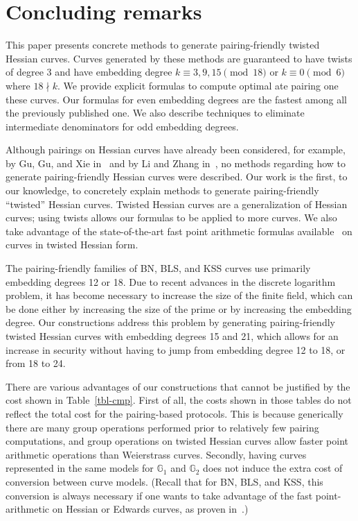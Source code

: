\section{Concluding remarks}
\label{sec:conclude}

This paper presents concrete methods to generate pairing-friendly twisted Hessian curves.
Curves generated by these methods are guaranteed to have twists of degree $3$
and have embedding degree
$k \equiv 3,9,15 \pmod{18}$ or
$k \equiv 0 \pmod{6}$ where $18 \nmid k$.
We provide explicit formulas to compute optimal ate pairing one these curves.
Our formulas for even embedding degrees are the fastest among all the previously published one.
We also describe techniques to eliminate intermediate denominators for odd embedding degrees.

Although pairings on Hessian curves have already been considered,
for example, by Gu, Gu, and Xie in~\cite{2010/Gu} and by Li and Zhang in~\cite{2012/Li},
no methods regarding how to generate pairing-friendly Hessian curves were described.
Our work is the first, to our knowledge, to concretely explain methods to generate
pairing-friendly ``twisted'' Hessian curves. %
Twisted Hessian curves are a generalization of Hessian curves; using twists allows our formulas to be applied to more curves.
We also take advantage of the state-of-the-art fast point arithmetic formulas available~\cite{2015/hessian}
on curves in twisted Hessian form.

The pairing-friendly families of BN, BLS, and KSS curves use primarily embedding degrees 12 or 18.
Due to recent advances in the discrete logarithm problem, it has become necessary to increase the size of the finite field,
which can be done either by increasing the size of the prime or by increasing the embedding degree.
Our constructions address this problem by generating pairing-friendly twisted Hessian curves with embedding degrees 15 and 21,
which allows for an increase in security without having to jump from embedding degree 12 to 18, or from 18 to 24.

There are various advantages of our constructions that cannot be justified by the cost shown in Table~\ref{tbl-cmp}. %
First of all, the costs shown in those tables do not reflect the total cost for the pairing-based protocols.
This is because generically there are many group operations performed prior to relatively few pairing computations,
and group operations on twisted Hessian curves allow faster point arithmetic operations than Weierstrass curves.
Secondly, having curves represented in the same models for $\mathbb{G}_1$ and $\mathbb{G}_2$ does not induce the extra cost of conversion between curve models.
(Recall that for BN, BLS, and KSS, this conversion is always necessary if one wants to take advantage of
the fast point-arithmetic on Hessian or Edwards curves, as proven in~\cite{2013/bos-pairing}.)

